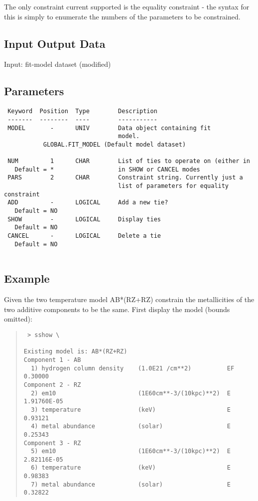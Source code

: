\documentclass{book}
\renewcommand{\_}{{\tt\char'137}}     %
\begin{document}
The only constraint current supported is the equality constraint - the
syntax for this is simply to enumerate the numbers of the parameters
to be constrained.
 
\subsection{Input Output Data}
Input: fit-model dataset (modified)
\subsection{Parameters}
\begin{verbatim}
 Keyword  Position  Type        Description
 -------  --------  ----        -----------
 MODEL       -      UNIV        Data object containing fit
                                model.
           GLOBAL.FIT_MODEL (Default model dataset)
 
 NUM         1      CHAR        List of ties to operate on (either in
   Default = *                  in SHOW or CANCEL modes
 PARS        2      CHAR        Constraint string. Currently just a
                                list of parameters for equality constraint
 ADD         -      LOGICAL     Add a new tie?
   Default = NO
 SHOW        -      LOGICAL     Display ties
   Default = NO
 CANCEL      -      LOGICAL     Delete a tie
   Default = NO
 
\end{verbatim}\subsection{Example}
Given the two temperature model AB*(RZ+RZ) constrain the metallicities
of the two additive components to be the same. First display the model
(bounds omitted):
\begin{quote}\begin{verbatim}
 > sshow \
 
Existing model is: AB*(RZ+RZ)
Component 1 - AB
  1) hydrogen column density    (1.0E21 /cm**2)          EF  0.30000
Component 2 - RZ
  2) em10                       (1E60cm**-3/(10kpc)**2)  E   1.91760E-05
  3) temperature                (keV)                    E   0.93121
  4) metal abundance            (solar)                  E   0.25343
Component 3 - RZ
  5) em10                       (1E60cm**-3/(10kpc)**2)  E   2.82116E-05
  6) temperature                (keV)                    E   0.98383
  7) metal abundance            (solar)                  E   0.32822
\end{verbatim}\end{quote}
\end{document}

